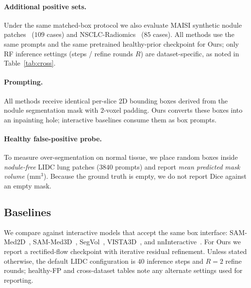 \documentclass[letterpaper]{article} %
\begin{document}
\paragraph{Additional positive sets.}
Under the same matched-box protocol we also evaluate
MAISI synthetic nodule patches~\citep{maisi2025} (\(109\) cases) and
NSCLC-Radiomics~\citep{aerts2014nsclc} (\(85\) cases).
All methods use the same prompts and the same pretrained healthy-prior
checkpoint for Ours; only RF inference settings (steps / refine rounds \(R\))
are dataset-specific, as noted in Table~\ref{tab:cross}.

\paragraph{Prompting.}
All methods receive identical per-slice 2D bounding boxes derived from the
nodule segmentation mask with \(2\)-voxel padding.
Ours converts these boxes into an inpainting hole; interactive baselines
consume them as box prompts.

\paragraph{Healthy false-positive probe.}
To measure over-segmentation on normal tissue, we place random boxes inside
\emph{nodule-free} LIDC lung patches (\(3840\) prompts) and report
\emph{mean predicted mask volume} (mm\(^3\)). Because the ground truth is
empty, we do not report Dice against an empty mask.

\subsection{Baselines}
We compare against interactive models that accept the same box interface:
SAM-Med2D~\citep{sam_med2d2023},
SAM-Med3D~\citep{sam_med3d2023},
SegVol~\citep{segvol2024},
VISTA3D~\citep{vista3d2024}, and
nnInteractive~\citep{nninteractive2025}.
For Ours we report a rectified-flow checkpoint with iterative residual
refinement. Unless stated otherwise, the default LIDC configuration is
\(40\) inference steps and \(R{=}2\) refine rounds; healthy-FP and
cross-dataset tables note any alternate settings used for reporting.
\end{document}
